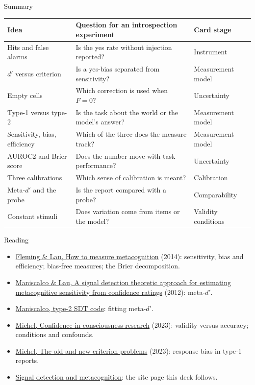 \documentclass[aspectratio=169,11pt]{beamer}
\newcommand{\site}{https://measuring-self-reports.github.io/measuring-self-reports}
\begin{document}
\begin{frame}[label=summary]{Summary}
\begin{center}
{\footnotesize\renewcommand{\arraystretch}{1.02}
\begin{tabular}{L{3.6cm}L{6.2cm}L{2.8cm}}
\toprule
\textbf{Idea} & \textbf{Question for an introspection experiment} & \textbf{Card stage} \\
\midrule
Hits and false alarms & Is the yes rate without injection reported? & Instrument \\
$d'$ versus criterion & Is a yes-bias separated from sensitivity? & Measurement model \\
Empty cells & Which correction is used when $F = 0$? & Uncertainty \\
Type-1 versus type-2 & Is the task about the world or the model's answer? & Measurement model \\
Sensitivity, bias, efficiency & Which of the three does the measure track? & Measurement model \\
AUROC2 and Brier score & Does the number move with task performance? & Uncertainty \\
Three calibrations & Which sense of calibration is meant? & Calibration \\
Meta-$d'$ and the probe & Is the report compared with a probe? & Comparability \\
Constant stimuli & Does variation come from items or the model? & Validity conditions \\
\bottomrule
\end{tabular}
}
\end{center}
\end{frame}

\begin{frame}[label=reading]{Reading}
\small
\begin{itemize}
  \item \href{https://www.frontiersin.org/articles/10.3389/fnhum.2014.00443/pdf}{Fleming \& Lau, How to measure metacognition} (2014): sensitivity, bias and efficiency; bias-free measures; the Brier decomposition.
  \item \href{https://www.sciencedirect.com/science/article/abs/pii/S1053810011002303}{Maniscalco \& Lau, A signal detection theoretic approach for estimating metacognitive sensitivity from confidence ratings} (2012): meta-$d'$.
  \item \href{https://www.columbia.edu/~bsm2105/type2sdt/}{Maniscalco, type-2 SDT code}: fitting meta-$d'$.
  \item \href{https://philarchive.org/archive/MICCIC-3}{Michel, Confidence in consciousness research} (2023): validity versus accuracy; conditions and confounds.
  \item \href{https://philpapers.org/archive/MICTOA-2.pdf}{Michel, The old and new criterion problems} (2023): response bias in type-1 reports.
  \item \href{\site/foundations/signal-detection/}{Signal detection and metacognition}: the site page this deck follows.
\end{itemize}
\end{frame}
\end{document}
